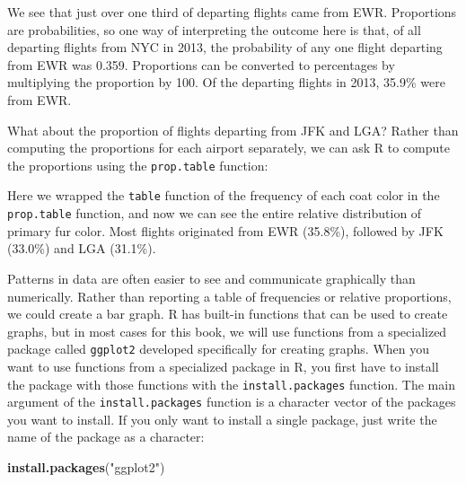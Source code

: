 \documentclass[
]{book}
\newenvironment{Shaded}{\begin{snugshade}}{\end{snugshade}}
\newcommand{\FloatTok}[1]{\textcolor[rgb]{0.00,0.00,0.81}{#1}}
\newcommand{\FunctionTok}[1]{\textcolor[rgb]{0.13,0.29,0.53}{\textbf{#1}}}
\newcommand{\NormalTok}[1]{#1}
\newcommand{\SpecialCharTok}[1]{\textcolor[rgb]{0.81,0.36,0.00}{\textbf{#1}}}
\newcommand{\StringTok}[1]{\textcolor[rgb]{0.31,0.60,0.02}{#1}}
\begin{document}
We see that just over one third of departing flights came from EWR. Proportions are probabilities, so one way of interpreting the outcome here is that, of all departing flights from NYC in 2013, the probability of any one flight departing from EWR was 0.359. Proportions can be converted to percentages by multiplying the proportion by 100. Of the departing flights in 2013, 35.9\% were from EWR.

What about the proportion of flights departing from JFK and LGA? Rather than computing the proportions for each airport separately, we can ask R to compute the proportions using the \texttt{prop.table} function:

\begin{Shaded}
\end{Shaded}

Here we wrapped the \texttt{table} function of the frequency of each coat color in the \texttt{prop.table} function, and now we can see the entire relative distribution of primary fur color. Most flights originated from EWR (35.8\%), followed by JFK (33.0\%) and LGA (31.1\%).

Patterns in data are often easier to see and communicate graphically than numerically. Rather than reporting a table of frequencies or relative proportions, we could create a bar graph. R has built-in functions that can be used to create graphs, but in most cases for this book, we will use functions from a specialized package called \texttt{ggplot2} developed specifically for creating graphs. When you want to use functions from a specialized package in R, you first have to install the package with those functions with the \texttt{install.packages} function. The main argument of the \texttt{install.packages} function is a character vector of the packages you want to install. If you only want to install a single package, just write the name of the package as a character:

\begin{Shaded}
\begin{Highlighting}[]
\FunctionTok{install.packages}\NormalTok{(}\StringTok{"ggplot2"}\NormalTok{)}
\end{Highlighting}
\end{Shaded}
\end{document}
